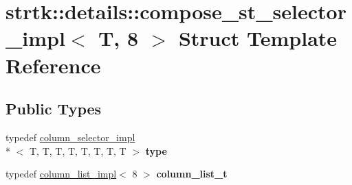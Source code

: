\hypertarget{structstrtk_1_1details_1_1compose__st__selector__impl_3_01T_00_018_01_4}{\section{strtk\-:\-:details\-:\-:compose\-\_\-st\-\_\-selector\-\_\-impl$<$ T, 8 $>$ Struct Template Reference}
\label{structstrtk_1_1details_1_1compose__st__selector__impl_3_01T_00_018_01_4}
}
\subsection*{Public Types}
\begin{DoxyCompactItemize}
\item 
\hypertarget{structstrtk_1_1details_1_1compose__st__selector__impl_3_01T_00_018_01_4_a216b174f9a7076b7d969f43c08e3a13a}{typedef \hyperlink{classstrtk_1_1details_1_1column__selector__impl}{column\-\_\-selector\-\_\-impl}\\*
$<$ T, T, T, T, T, T, T, T $>$ {\bfseries type}}\label{structstrtk_1_1details_1_1compose__st__selector__impl_3_01T_00_018_01_4_a216b174f9a7076b7d969f43c08e3a13a}

\item 
\hypertarget{structstrtk_1_1details_1_1compose__st__selector__impl_3_01T_00_018_01_4_a69aa253f7d932a920cb7e13cc83e8d9d}{typedef \hyperlink{structstrtk_1_1details_1_1column__list__impl}{column\-\_\-list\-\_\-impl}$<$ 8 $>$ {\bfseries column\-\_\-list\-\_\-t}}\label{structstrtk_1_1details_1_1compose__st__selector__impl_3_01T_00_018_01_4_a69aa253f7d932a920cb7e13cc83e8d9d}

\end{DoxyCompactItemize}
